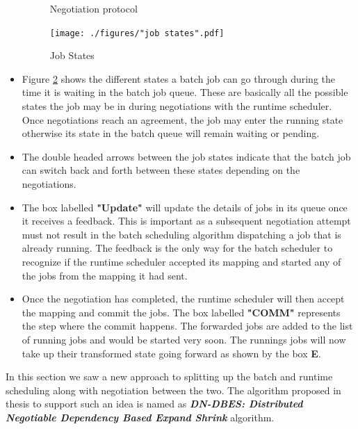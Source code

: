 \begin{itemize}
\begin{figure}[!htbp]
\caption{Negotiation protocol}
\label{fig:2}
\end{figure}
\begin{figure}[!htbp]
\centering
\texttt{[image: ./figures/"job states".pdf]}
\caption{Job States}
\label{fig:53}
\end{figure}
\item Figure \ref{fig:53} shows the different states a batch job can go through during the time it is waiting in the batch job queue. These are basically all the possible states the job may be in during negotiations with the runtime scheduler. Once negotiations reach an agreement, the job may enter the running state otherwise its state in the batch queue will remain waiting or pending.
\item The double headed arrows between the job states indicate that the batch job can switch back and forth between these states depending on the negotiations.
\item The box labelled \textbf{"Update"} will update the details of jobs in its queue once it receives a feedback. This is important as a subsequent negotiation attempt must not result in the batch scheduling algorithm dispatching a job that is already running. The feedback is the only way for the batch scheduler to recognize if the runtime scheduler accepted its mapping and started any of the jobs from the mapping it had sent.  
\item Once the negotiation has completed, the runtime scheduler will then accept the mapping and commit the jobs. The box labelled \textbf{"COMM"} represents the step where the commit happens. The forwarded jobs are added to the list of running jobs and would be started very soon. The runnings jobs will now take up their transformed state going forward as shown by the box \textbf{E}.
\end{itemize}
In this section we saw a new approach to splitting up the batch and runtime scheduling along with negotiation between the two. The algorithm proposed in thesis to support such an idea is named as \textbf{\textit{DN-DBES: Distributed Negotiable Dependency Based Expand Shrink}} algorithm.
